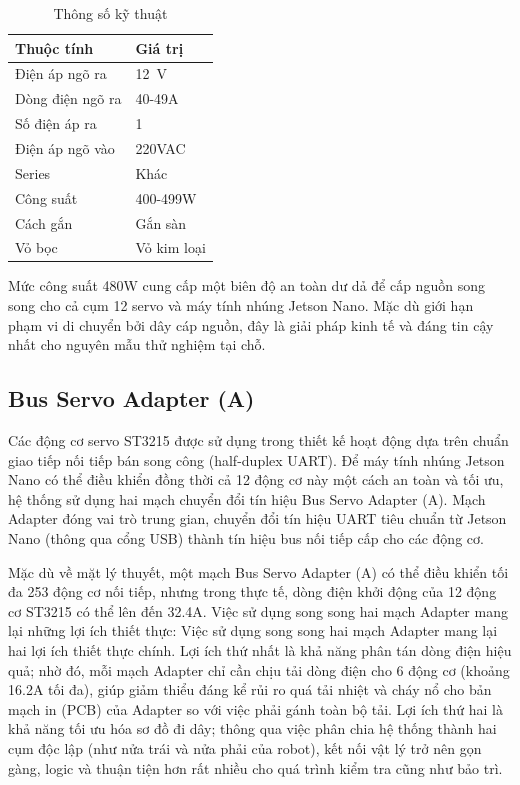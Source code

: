 \begin{table}[H] %
\centering
\caption{Thông số kỹ thuật}
\renewcommand{\arraystretch}{1.3}
\begin{tabular}{p{} p{}}
\toprule
\textbf{Thuộc tính} & \textbf{Giá trị} \\
\midrule
Điện áp ngõ ra & 12~V \\
Dòng điện ngõ ra & 40-49A \\
Số điện áp ra & 1 \\
Điện áp ngõ vào & 220VAC \\
Series & Khác \\
Công suất & 400-499W \\
Cách gắn & Gắn sàn \\
Vỏ bọc & Vỏ kim loại \\
\bottomrule
\end{tabular}
\end{table}

Mức công suất 480W cung cấp một biên độ an toàn dư dả để cấp nguồn song song cho cả cụm 12 servo và máy tính nhúng Jetson Nano. Mặc dù giới hạn phạm vi di chuyển bởi dây cáp nguồn, đây là giải pháp kinh tế và đáng tin cậy nhất cho nguyên mẫu thử nghiệm tại chỗ.

\subsection{Bus Servo Adapter (A)}

Các động cơ servo ST3215 được sử dụng trong thiết kế hoạt động dựa trên chuẩn giao tiếp nối tiếp bán song công (half-duplex UART). Để máy tính nhúng Jetson Nano có thể điều khiển đồng thời cả 12 động cơ này một cách an toàn và tối ưu, hệ thống sử dụng hai mạch chuyển đổi tín hiệu Bus Servo Adapter (A). Mạch Adapter đóng vai trò trung gian, chuyển đổi tín hiệu UART tiêu chuẩn từ Jetson Nano (thông qua cổng USB) thành tín hiệu bus nối tiếp cấp cho các động cơ. 

Mặc dù về mặt lý thuyết, một mạch Bus Servo Adapter (A) có thể điều khiển tối đa 253 động cơ nối tiếp, nhưng trong thực tế, dòng điện khởi động của 12 động cơ ST3215 có thể lên đến 32.4A. Việc sử dụng song song hai mạch Adapter mang lại những lợi ích thiết thực:
Việc sử dụng song song hai mạch Adapter mang lại hai lợi ích thiết thực chính. Lợi ích thứ nhất là khả năng phân tán dòng điện hiệu quả; nhờ đó, mỗi mạch Adapter chỉ cần chịu tải dòng điện cho 6 động cơ (khoảng 16.2A tối đa), giúp giảm thiểu đáng kể rủi ro quá tải nhiệt và cháy nổ cho bản mạch in (PCB) của Adapter so với việc phải gánh toàn bộ tải. Lợi ích thứ hai là khả năng tối ưu hóa sơ đồ đi dây; thông qua việc phân chia hệ thống thành hai cụm độc lập (như nửa trái và nửa phải của robot), kết nối vật lý trở nên gọn gàng, logic và thuận tiện hơn rất nhiều cho quá trình kiểm tra cũng như bảo trì.

